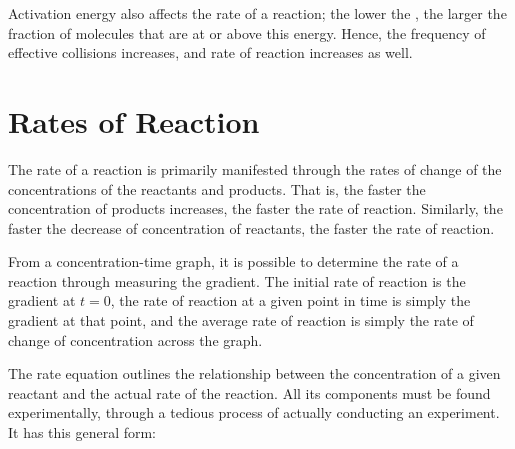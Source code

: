 			Activation energy also affects the rate of a reaction; the lower the \ea{}, the larger the fraction of molecules that are at or above
			this energy. Hence, the frequency of effective collisions increases, and rate of reaction increases as well.



	\section{Rates of Reaction}

		The rate of a reaction is primarily manifested through the rates of change of the concentrations of the reactants and products. That is,
		the faster the concentration of products increases, the faster the rate of reaction. Similarly, the faster the decrease of
		concentration of reactants, the faster the rate of reaction.


		From a concentration-time graph, it is possible to determine the rate of a reaction through measuring the gradient.
		The initial rate of reaction is the gradient at $t = 0$, the rate of reaction at a given point in time is simply the gradient at that
		point, and the average rate of reaction is simply the rate of change of concentration across the graph.


		\pagebreak

		The rate equation outlines the relationship between the concentration of a given reactant and the actual rate of the reaction.
		All its components must be found experimentally, through a tedious process of actually conducting an experiment. It has this
		general form:


